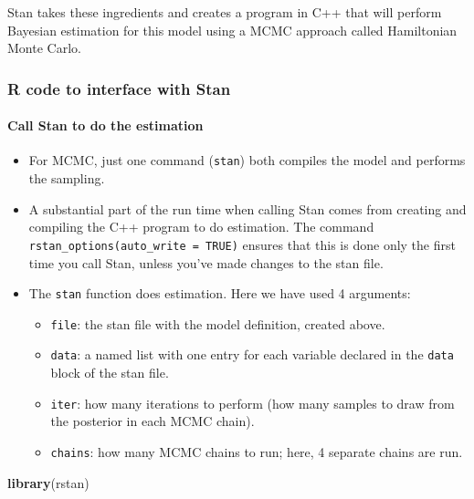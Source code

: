 \documentclass[]{article}
\newenvironment{Shaded}{\begin{snugshade}}{\end{snugshade}}
\newcommand{\KeywordTok}[1]{\textcolor[rgb]{0.13,0.29,0.53}{\textbf{#1}}}
\newcommand{\NormalTok}[1]{#1}
\providecommand{\tightlist}{%
  \setlength{\itemsep}{0pt}\setlength{\parskip}{0pt}}
\let\oldparagraph\paragraph
\renewcommand{\paragraph}[1]{\oldparagraph{#1}\mbox{}}
\begin{document}
Stan takes these ingredients and creates a program in C++ that will
perform Bayesian estimation for this model using a MCMC approach called
Hamiltonian Monte Carlo.

\subsubsection{R code to interface with
Stan}\label{r-code-to-interface-with-stan}

\paragraph{Call Stan to do the
estimation}\label{call-stan-to-do-the-estimation}

\begin{itemize}
\tightlist
\item
  For MCMC, just one command (\texttt{stan}) both compiles the model and
  performs the sampling.
\item
  A substantial part of the run time when calling Stan comes from
  creating and compiling the C++ program to do estimation. The command
  \texttt{rstan\_options(auto\_write\ =\ TRUE)} ensures that this is
  done only the first time you call Stan, unless you've made changes to
  the stan file.
\item
  The \texttt{stan} function does estimation. Here we have used 4
  arguments:

  \begin{itemize}
  \tightlist
  \item
    \texttt{file}: the stan file with the model definition, created
    above.
  \item
    \texttt{data}: a named list with one entry for each variable
    declared in the \texttt{data} block of the stan file.
  \item
    \texttt{iter}: how many iterations to perform (how many samples to
    draw from the posterior in each MCMC chain).
  \item
    \texttt{chains}: how many MCMC chains to run; here, 4 separate
    chains are run.
  \end{itemize}
\end{itemize}

\begin{Shaded}
\begin{Highlighting}[]
\KeywordTok{library}\NormalTok{(rstan)}
\end{Highlighting}
\end{Shaded}
\end{document}
